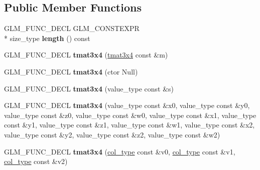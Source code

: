 \subsection*{Public Member Functions}
\begin{DoxyCompactItemize}
\item 
\hypertarget{structglm_1_1detail_1_1tmat3x4_a7d520f11723cd0828b9a8f66af715c5f}{G\-L\-M\-\_\-\-F\-U\-N\-C\-\_\-\-D\-E\-C\-L G\-L\-M\-\_\-\-C\-O\-N\-S\-T\-E\-X\-P\-R \\*
size\-\_\-type {\bfseries length} () const }\label{structglm_1_1detail_1_1tmat3x4_a7d520f11723cd0828b9a8f66af715c5f}

\item 
\hypertarget{structglm_1_1detail_1_1tmat3x4_a0fc4926d8a72adc932b36f0be3c924ee}{G\-L\-M\-\_\-\-F\-U\-N\-C\-\_\-\-D\-E\-C\-L {\bfseries tmat3x4} (\hyperlink{structglm_1_1detail_1_1tmat3x4}{tmat3x4} const \&m)}\label{structglm_1_1detail_1_1tmat3x4_a0fc4926d8a72adc932b36f0be3c924ee}

\item 
\hypertarget{structglm_1_1detail_1_1tmat3x4_ada4cb47bbe810d5327a994856d66ba38}{G\-L\-M\-\_\-\-F\-U\-N\-C\-\_\-\-D\-E\-C\-L {\bfseries tmat3x4} (ctor Null)}\label{structglm_1_1detail_1_1tmat3x4_ada4cb47bbe810d5327a994856d66ba38}

\item 
\hypertarget{structglm_1_1detail_1_1tmat3x4_ad79c02c5d9ba799ee50185a577cff941}{G\-L\-M\-\_\-\-F\-U\-N\-C\-\_\-\-D\-E\-C\-L {\bfseries tmat3x4} (value\-\_\-type const \&s)}\label{structglm_1_1detail_1_1tmat3x4_ad79c02c5d9ba799ee50185a577cff941}

\item 
\hypertarget{structglm_1_1detail_1_1tmat3x4_a163812d2dd1aeddf6f36bf5e7f9bec93}{G\-L\-M\-\_\-\-F\-U\-N\-C\-\_\-\-D\-E\-C\-L {\bfseries tmat3x4} (value\-\_\-type const \&x0, value\-\_\-type const \&y0, value\-\_\-type const \&z0, value\-\_\-type const \&w0, value\-\_\-type const \&x1, value\-\_\-type const \&y1, value\-\_\-type const \&z1, value\-\_\-type const \&w1, value\-\_\-type const \&x2, value\-\_\-type const \&y2, value\-\_\-type const \&z2, value\-\_\-type const \&w2)}\label{structglm_1_1detail_1_1tmat3x4_a163812d2dd1aeddf6f36bf5e7f9bec93}

\item 
\hypertarget{structglm_1_1detail_1_1tmat3x4_af4a8d8a9f6d1c5b61b7a77041fd3b04d}{G\-L\-M\-\_\-\-F\-U\-N\-C\-\_\-\-D\-E\-C\-L {\bfseries tmat3x4} (\hyperlink{structglm_1_1detail_1_1tvec4}{col\-\_\-type} const \&v0, \hyperlink{structglm_1_1detail_1_1tvec4}{col\-\_\-type} const \&v1, \hyperlink{structglm_1_1detail_1_1tvec4}{col\-\_\-type} const \&v2)}\label{structglm_1_1detail_1_1tmat3x4_af4a8d8a9f6d1c5b61b7a77041fd3b04d}


\end{DoxyCompactItemize}
